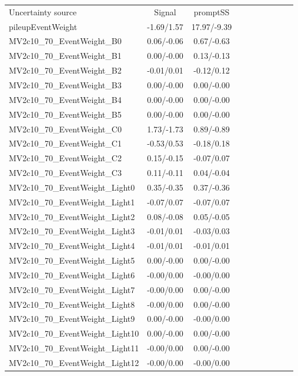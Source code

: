 \begin{table}[h]
\scriptsize
\begin{center}
\begin{tabular}{l|ccccccccc}
\hline
\hline
Uncertainty source &Signal &promptSS \\
pileupEventWeight &-1.69/1.57 &17.97/-9.39 \\
MV2c10\_70\_EventWeight\_B0 &0.06/-0.06 &0.67/-0.63 \\
MV2c10\_70\_EventWeight\_B1 &0.00/-0.00 &0.13/-0.13 \\
MV2c10\_70\_EventWeight\_B2 &-0.01/0.01 &-0.12/0.12 \\
MV2c10\_70\_EventWeight\_B3 &0.00/-0.00 &0.00/-0.00 \\
MV2c10\_70\_EventWeight\_B4 &0.00/-0.00 &0.00/-0.00 \\
MV2c10\_70\_EventWeight\_B5 &0.00/-0.00 &0.00/-0.00 \\
MV2c10\_70\_EventWeight\_C0 &1.73/-1.73 &0.89/-0.89 \\
MV2c10\_70\_EventWeight\_C1 &-0.53/0.53 &-0.18/0.18 \\
MV2c10\_70\_EventWeight\_C2 &0.15/-0.15 &-0.07/0.07 \\
MV2c10\_70\_EventWeight\_C3 &0.11/-0.11 &0.04/-0.04 \\
MV2c10\_70\_EventWeight\_Light0 &0.35/-0.35 &0.37/-0.36 \\
MV2c10\_70\_EventWeight\_Light1 &-0.07/0.07 &-0.07/0.07 \\
MV2c10\_70\_EventWeight\_Light2 &0.08/-0.08 &0.05/-0.05 \\
MV2c10\_70\_EventWeight\_Light3 &-0.01/0.01 &-0.03/0.03 \\
MV2c10\_70\_EventWeight\_Light4 &-0.01/0.01 &-0.01/0.01 \\
MV2c10\_70\_EventWeight\_Light5 &0.00/-0.00 &0.00/-0.00 \\
MV2c10\_70\_EventWeight\_Light6 &-0.00/0.00 &-0.00/0.00 \\
MV2c10\_70\_EventWeight\_Light7 &-0.00/0.00 &0.00/-0.00 \\
MV2c10\_70\_EventWeight\_Light8 &-0.00/0.00 &0.00/-0.00 \\
MV2c10\_70\_EventWeight\_Light9 &0.00/-0.00 &-0.00/0.00 \\
MV2c10\_70\_EventWeight\_Light10 &0.00/-0.00 &0.00/-0.00 \\
MV2c10\_70\_EventWeight\_Light11 &-0.00/0.00 &0.00/-0.00 \\
MV2c10\_70\_EventWeight\_Light12 &-0.00/0.00 &-0.00/0.00 \\

\end{tabular}
\end{center}
\end{table}
